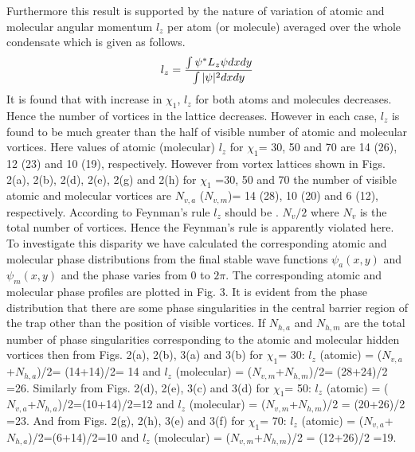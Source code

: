 \documentclass[10pt,a4paper]{article}
\begin{document}
Furthermore this result is supported by the nature of variation of
atomic and molecular angular momentum $l_z$ per atom (or molecule)
averaged over the whole condensate which is given as follows.
\begin{eqnarray} l_z={\int \psi^* L_z\psi dx dy \over \int |\psi
|^2 dx dy }
\end{eqnarray} It is found that with increase
in $\chi_1$, $l_z$ for both atoms and molecules decreases. Hence
the number of vortices in the lattice decreases. However in each
case, $l_z$ is found to be much greater than the half of visible
number of atomic and molecular vortices. Here values of atomic
(molecular) $l_z$ for $\chi_1$= 30, 50 and 70 are 14 (26), 12 (23)
and 10 (19), respectively. However from vortex lattices shown in
Figs. 2(a), 2(b), 2(d), 2(e), 2(g) and 2(h) for $\chi_1$ =30, 50
and 70 the number of visible atomic and molecular vortices are
$N_{v,a}$ ($N_{v,m}$)= 14 (28), 10 (20) and 6 (12), respectively.
According to Feynman’s rule $l_z$ should be . $N_v/2$ where $N_v$
is the total number of vortices. Hence the Feynman’s rule is
apparently violated here. To investigate this disparity we have
calculated the corresponding atomic and molecular phase
distributions from the final stable wave functions $\psi_a(x,y)$
and $\psi_m(x,y)$ and the phase varies from 0 to $2\pi$. The
corresponding atomic and molecular phase profiles are plotted in
Fig. 3. It is evident from the phase distribution that there are
some phase singularities in the central barrier region of the trap
other than the position of visible vortices. If $N_{h,a}$ and $N_{h,m}$
are the total number of phase singularities corresponding to the 
atomic and molecular hidden vortices then from Figs. 2(a), 2(b), 3(a) and 3(b) 
for $\chi_1$= 30: $l_z$ (atomic) = ($N_{v,a}$+$N_{h,a}$)/2= (14+14)/2= 14 and 
$l_z$ (molecular) = ($N_{v,m}$+$N_{h,m}$)/2= (28+24)/2 =26. Similarly from Figs. 2(d), 
2(e), 3(c) and 3(d) for $\chi_1$= 50: $l_z$ (atomic) = ($N_{v,a}$+$N_{h,a}$)/2=(10+14)/2=12 
and $l_z$ (molecular) = ($N_{v,m}$+$N_{h,m}$)/2 = (20+26)/2 =23. And from Figs. 2(g), 
2(h), 3(e) and 3(f) for $\chi_1$= 70: $l_z$ (atomic) =
($N_{v,a}$+$N_{h,a}$)/2=(6+14)/2=10 and $l_z$ (molecular) =
($N_{v,m}$+$N_{h,m}$)/2 = (12+26)/2 =19.
\end{document}
